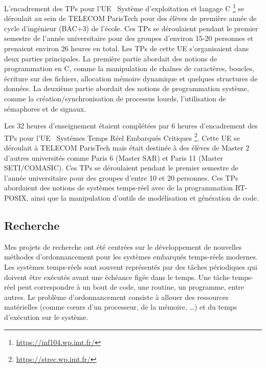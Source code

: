 \documentclass{article}
\begin{document}
L'encadrement des TPs pour l'UE \guillemotleft\ 
Système d'exploitation et langage C 
\guillemotright\footnote{\url{https://inf104.wp.imt.fr/}} se déroulait au sein de TELECOM ParisTech pour 
des 
élèves de première année de cycle d'ingénieur (BAC+3) de l'école. Ces TPs se déroulaient pendant le 
premier semestre de l'année universitaire pour des groupes d'environ 15-20 personnes et prenaient environ 
26 heures en total. Les TPs de cette UE s'organisaient dans deux parties principales. La première partie 
abordait des notions de programmation en C, comme la manipulation de chaînes de caractères, 
boucles, écriture sur des fichiers, allocation mémoire dynamique et quelques structures de données. La 
deuxième partie abordait des notions de programmation système, comme la création/synchronisation de 
processus lourds, l'utilisation de sémaphores et de signaux.
\vspace{.5cm}

Les 32 heures d'enseignement étaient complétées par 6 heures d'encadrement des TPs pour l'UE 
\guillemotleft\ Systémes Temps Réel Embarqués Critiques 
\guillemotright\footnote{\url{https://strec.wp.imt.fr/}}. Cette UE se déroulait à TELECOM ParisTech mais 
était destinée à des élèves de Master 2 d'autres universités comme Paris 6 (Master SAR) et Paris 11 (Master 
SETI/COMASIC). Ces TPs se déroulaient pendant le premier semestre de l'année universitaire pour des 
groupes d'entre 10 et 20 personnes. Ces TPs abordaient des notions de systèmes temps-réel avec de la 
programmation RT-POSIX, ainsi que la manipulation d'outils de modélisation et génération de code.

\subsection{Recherche}

Mes projets de recherche ont été centrées sur le développement de nouvelles méthodes d'ordonnancement 
pour les systèmes embarqués temps-réels modernes. Les systèmes temps-réels sont souvent représentés 
par des tâches périodiques qui doivent être exécutés avant une échéance figée dans le temps. Une 
tâche temps-réel peut correspondre à un bout de code, une routine, un programme, entre autres. Le 
problème d'ordonnancement consiste à allouer des ressources matérielles (comme c\oe{}urs d'un 
processeur, de la mémoire, \dots) et du temps d'exécution sur le système.
\vspace{.5cm}
\end{document}
